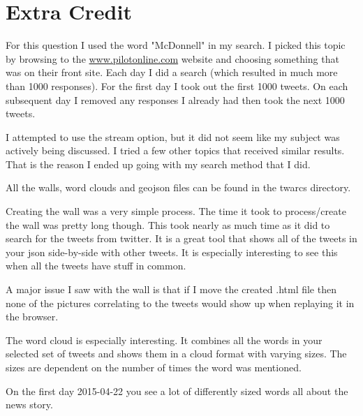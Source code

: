 \documentclass[12pt]{article}
\begin{document}
\section{Extra Credit}
For this question I used the word "McDonnell" in my search. I picked this topic by browsing to the \url{www.pilotonline.com} website and choosing something that was on their front site. Each day I did a search (which resulted in much more than 1000 responses).  For the first day I took out the first 1000 tweets.  On each subsequent day I removed any responses I already had then took the next 1000 tweets.

I attempted to use the stream option, but it did not seem like my subject was actively being discussed.  I tried a few other topics that received similar results.  That is the reason I ended up going with my search method that I did.

All the walls, word clouds and geojson files can be found in the twarcs directory.

Creating the wall was a very simple process. The time it took to process/create the wall was pretty long though. This took nearly as much time as it did to search for the tweets from twitter. It is a great tool that shows all of the tweets in your json side-by-side with other tweets. It is especially interesting to see this when all the tweets have stuff in common.

A major issue I saw with the wall is that if I move the created .html file then none of the pictures correlating to the tweets would show up when replaying it in the browser.

The word cloud is especially interesting. It combines all the words in your selected set of tweets and shows them in a cloud format with varying sizes.  The sizes are dependent on the number of times the word was mentioned.

On the first day 2015-04-22 you see a lot of differently sized words all about the news story.
\end{document}
